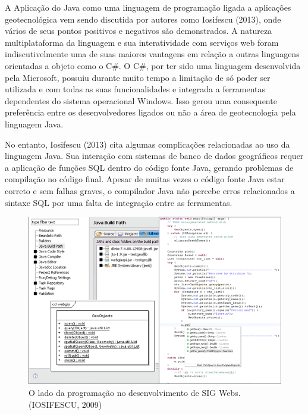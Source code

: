 		A Aplicação do Java como uma linguagem de programação ligada a aplicações geotecnológica vem sendo discutida por autores como Iosifescu (2013)\cite{IOSIFESCU_13}, onde vários de seus pontos positivos e negativos são demonstrados. A natureza multiplataforma da linguagem e sua interatividade com serviços web foram indiscutivelmente uma de suas maiores vantagens em relação a outras linguagens orientadas a objeto como o C\#. O C\#, por ter sido uma linguagem desenvolvida pela Microsoft, possuiu durante muito tempo a limitação de só poder ser utilizada e com todas as suas funcionalidades e integrada a ferramentas dependentes do sistema operacional Windows. Isso gerou uma consequente preferência entre os desenvolvedores ligados ou não a área de geotecnologia pela linguagem Java. 
		
		No entanto, Iosifescu (2013)\cite{IOSIFESCU_13} cita algumas complicações relacionadas ao uso da linguagem Java. Sua interação com sistemas de banco de dados geográficos requer a aplicação de funções SQL dentro do código fonte Java, gerando problemas de compilação no código final. Apesar de muitas vezes o código fonte Java estar correto e sem falhas graves, o compilador Java não percebe erros relacionados a sintaxe SQL por uma falta de integração entre as ferramentas.
		
		\begin{figure}
			\centering
			\includegraphics[width=1\linewidth]{data/sigweb_developer_side}
			\caption{O lado da programação no desenvolvimento de SIG Webs. (IOSIFESCU, 2009)}
			\label{fig:sigwebdeveloperside}
		\end{figure}
	
